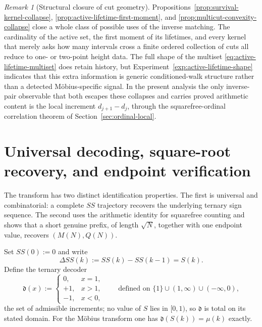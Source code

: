 \documentclass[11pt]{amsart}
\numberwithin{equation}{section}
\theoremstyle{plain}
\theoremstyle{definition}
\theoremstyle{remark}
\newtheorem{remark}[theorem]{Remark}
\begin{document}
\begin{remark}[Structural closure of cut geometry]
\label{rem:survival-kernel-negative}
Propositions~\ref{prop:survival-kernel-collapse},
\ref{prop:active-lifetime-first-moment}, and
\ref{prop:multicut-convexity-collapse} close a whole class of possible uses of
the inverse matching.  The cardinality of the active set, the first moment of
its lifetimes, and every kernel that merely asks how many intervals cross a
finite ordered collection of cuts all reduce to one- or two-point height data.
The full shape of the multiset \eqref{eq:active-lifetime-multiset} does retain
history, but Experiment~\ref{exp:active-lifetime-shape} indicates that this
extra information is generic conditioned-walk structure rather than a detected
M\"obius-specific signal.  In the present analysis the only inverse-pair
observable that both escapes these collapses and carries proved arithmetic
content is the local increment $d_{j+1}-d_j$, through the squarefree-ordinal
correlation theorem of Section~\ref{sec:ordinal-local}.
\end{remark}


\section{Universal decoding, square-root recovery, and endpoint verification}
\label{sec:recovery}

The transform has two distinct identification properties.  The first is
universal and combinatorial: a complete $SS$ trajectory recovers the underlying
ternary sign sequence.  The second uses the arithmetic identity for squarefree
counting and shows that a short genuine prefix, of length $\sqrt N$, together
with one endpoint value, recovers $(M(N),Q(N))$.

Set $SS(0):=0$ and write
\begin{equation}
\label{eq:ss-increment-decoder}
\Delta SS(k):=SS(k)-SS(k-1)=S(k).
\end{equation}
Define the ternary decoder
\begin{equation}
\label{eq:ternary-decoder}
\mathfrak d(x):=
\begin{cases}
0,&x=1,\\
+1,&x>1,\\
-1,&x<0,
\end{cases}
\qquad\text{defined on }\{1\}\cup(1,\infty)\cup(-\infty,0),
\end{equation}
the set of admissible increments; no value of $S$ lies in $[0,1)$, so
$\mathfrak d$ is total on its stated domain.  For the M\"obius transform one has
$\mathfrak d(S(k))=\mu(k)$ exactly.
\end{document}
